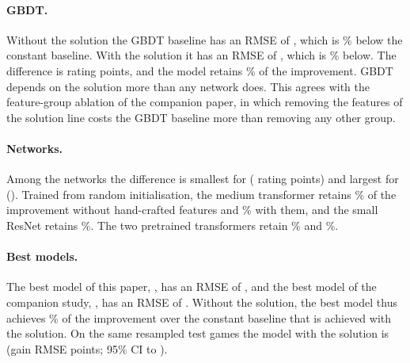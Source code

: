 \documentclass[11pt]{article}
\begin{document}
\begin{table}[htbp]\centering\small
{}
\caption{Test RMSE of each model without the solution (\emph{Hidden}, this
paper) and of the model of the same name with the solution (\emph{Shown},
the companion study, ), on the same test puzzles.
\emph{Difference} is the hidden RMSE minus the shown RMSE%
\ifshownpaired
, paired on the same resampled test games and bold when statistically
significant%
\fi
. \emph{Retained} is the improvement of the hidden model over the constant
baseline as a percentage of the improvement of the shown model.}
\label{tab:shown}
\end{table}

\paragraph{GBDT.}
Without the solution the GBDT baseline has an RMSE of
, which is \%
below the constant baseline. With the solution it has an RMSE of
, which is \%
below. The difference is  rating points, and the
model retains \% of the improvement. GBDT
depends on the solution more than any network does. This agrees with the
feature-group ablation of the companion paper, in which removing the features
of the solution line costs the GBDT baseline more than removing any other
group.

\paragraph{Networks.}
Among the networks the difference is smallest for
 ( rating points)
and largest for 
(). Trained from random initialisation, the
medium transformer retains \% of
the improvement without hand-crafted features and
\% with them, and the small
ResNet retains \%. The two pretrained
transformers retain \%
and \%.

\paragraph{Best models.}
The best model of this paper, , has an RMSE of
, and the best model of the companion study,
, has an RMSE of . Without the
solution, the best model thus achieves \% of the
improvement over the constant baseline that is achieved with the solution.
\ifshownpaired
On the same resampled test games the model with the solution is
 (gain  RMSE points; 95\% CI
 to ).
\fi
\end{document}
